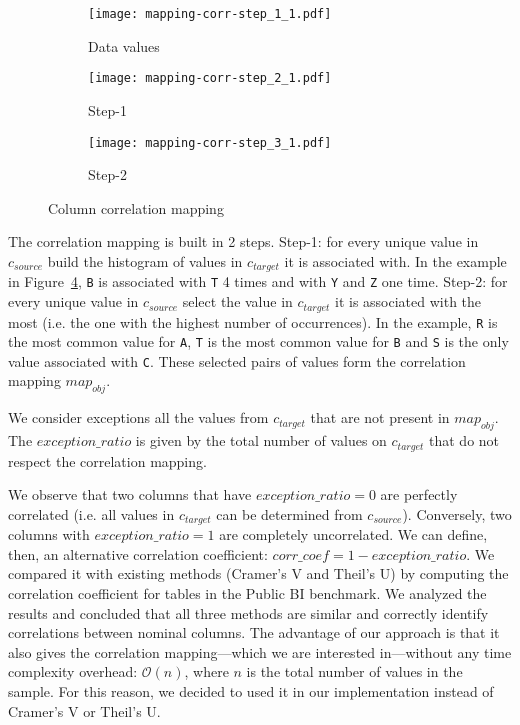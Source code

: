 \begin{figure}[h]
  \centering
  \begin{subfigure}[t]{0.22\linewidth}
    \centering
    \texttt{[image: mapping-corr-step\_1\_1.pdf]}
    \caption[b]{Data values}
    \label{fig:pd:columncorrelation:mapping:step1}
  \end{subfigure}
  \hspace{3em}
  \begin{subfigure}[t]{0.23\linewidth}
    \centering
    \texttt{[image: mapping-corr-step\_2\_1.pdf]}
    \caption[b]{Step-1}
    \label{fig:pd:columncorrelation:mapping:step2}
  \end{subfigure}
  \hspace{3em}
  \begin{subfigure}[t]{0.23\linewidth}
    \centering
    \texttt{[image: mapping-corr-step\_3\_1.pdf]}
    \caption[b]{Step-2}
    \label{fig:pd:columncorrelation:mapping:step3}
  \end{subfigure}
  \caption{Column correlation mapping}
  \label{fig:pd:columncorrelation:mapping}
\end{figure}

The correlation mapping is built in 2 steps. Step-1: for every unique value in \(c_{source}\) build the histogram of values in \(c_{target}\) it is associated with. In the example in Figure~\ref{fig:pd:columncorrelation:mapping}, \verb|B| is associated with \verb|T| 4 times and with \verb|Y| and \verb|Z| one time. Step-2: for every unique value in \(c_{source}\) select the value in \(c_{target}\) it is associated with the most (i.e. the one with the highest number of occurrences). In the example, \verb|R| is the most common value for \verb|A|, \verb|T| is the most common value for \verb|B| and \verb|S| is the only value associated with \verb|C|. These selected pairs of values form the correlation mapping \(map_{obj}\).

We consider exceptions all the values from \(c_{target}\) that are not present in \(map_{obj}\). The \(exception\_ratio\) is given by the total number of values on \(c_{target}\) that do not respect the correlation mapping.

We observe that two columns that have \(exception\_ratio = 0\) are perfectly correlated (i.e. all values in \(c_{target}\) can be determined from \(c_{source}\)). Conversely, two columns with \(exception\_ratio = 1\) are completely uncorrelated. We can define, then, an alternative correlation coefficient: 
\(\mathit{corr\_coef} = 1 - exception\_ratio\). We compared it with existing methods (Cramer's V and Theil's U) by computing the correlation coefficient for tables in the Public BI benchmark. We analyzed the results and concluded that all three methods are similar and correctly identify correlations between nominal columns. The advantage of our approach is that it also gives the correlation mapping---which we are interested in---without any time complexity overhead: \(\mathcal{O}(n)\), where \(n\) is the total number of values in the sample. For this reason, we decided to used it in our implementation instead of Cramer's V or Theil's U.

